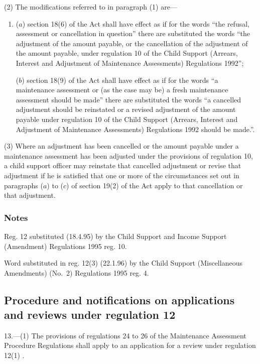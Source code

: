 \documentclass[a4paper]{article}
\newcommand\amendment[1]{\subsubsection*{Notes}{\itshape\frenchspacing\footnotesize #1 \par}}
\begin{document}
(2) The modifications referred to in paragraph (1) are—
\begin{enumerate}\item[]
($a$) section 18(6) of the Act shall have effect as if for the words “the refusal, assessment or cancellation in question” there are substituted the words “the adjustment of the amount payable, or the cancellation of the adjustment of the amount payable, under regulation 10 of the Child Support (Arrears, Interest and Adjustment of Maintenance Assessments) Regulations 1992”;

($b$) section 18(9) of the Act shall have effect as if for the words “a maintenance assessment or (as the case may be) a fresh maintenance assessment should be made” there are substituted the words “a cancelled adjustment should be reinstated or a revised adjustment of the amount payable under regulation 10 of the Child Support (Arrears, Interest and Adjustment of Maintenance Assessments) Regulations 1992 should be made.”.
\end{enumerate}

(3) Where an adjustment has been cancelled or the amount payable under a maintenance assessment has been adjusted under the provisions of regulation 10, a child support officer may reinstate that cancelled adjustment or revise that adjustment if he is satisfied that one or more of the circumstances set out in paragraphs ($a$) to ($c$) of section 
19(2)  %
of the Act apply to that cancellation or that adjustment.

\amendment{

Reg. 12 substituted (18.4.95) by the Child Support and Income Support (Amendment) Regulations 1995 reg. 10.

Word substituted in reg. 12(3) (22.1.96) by the Child Support (Miscellaneous Amendments) (No.\ 2) Regulations 1995 reg. 4.
}

\subsection[13. Procedure and notifications on applications and reviews under regulation 12]{Procedure and notifications on applications and reviews under regulation 12}

13.—(1) The provisions of regulations 24 to 26 of the Maintenance Assessment Procedure Regulations shall apply to an application for a review under regulation 12(1)%
.
\end{document}
